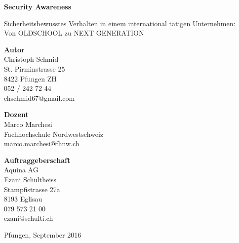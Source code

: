 \documentclass[../../main.tex]{subfiles}
\begin{document}
\vspace*{6cm}

\textbf{Security Awareness}

Sicherheitsbewusstes Verhalten in einem international tätigen Unternehmen: \\Von OLDSCHOOL zu NEXT GENERATION 
\vspace{1cm}

\textbf{Autor}\\
Christoph Schmid\\
St. Pirminstrasse 25\\
8422 Pfungen ZH\\
052 / 242 72 44\\
chschmid67@gmail.com


\textbf{Dozent}\\
Marco Marchesi\\
Fachhochschule Nordwestschweiz\\
marco.marchesi@fhnw.ch

\textbf{Auftraggeberschaft}\\
Aquina AG\\
Ezani Schultheiss\\
Stampfistrasse 27a\\
8193 Eglisau\\
079 573 21 00\\
ezani@schulti.ch

\vspace{1cm}

Pfungen, September 2016
\end{document}
